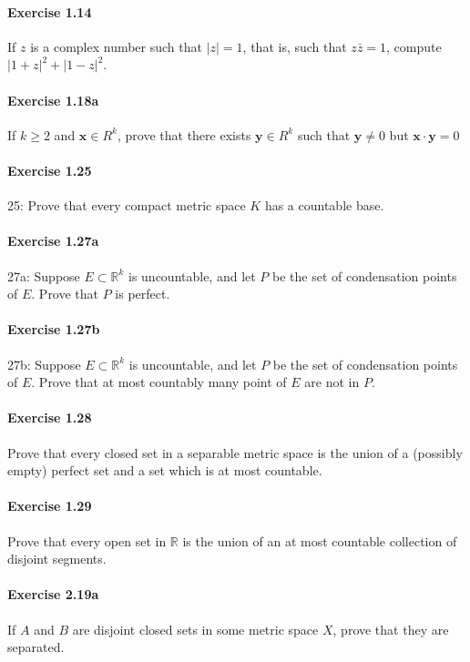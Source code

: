 \documentclass{article}
\begin{document}
\paragraph{Exercise 1.14} If $z$ is a complex number such that $|z|=1$, that is, such that $z \bar{z}=1$, compute $|1+z|^{2}+|1-z|^{2}$.

\paragraph{Exercise 1.18a} If $k \geq 2$ and $\mathbf{x} \in R^{k}$, prove that there exists $\mathbf{y} \in R^{k}$ such that $\mathbf{y} \neq 0$ but $\mathbf{x} \cdot \mathbf{y}=0$

\paragraph{Exercise 1.25} 25: Prove that every compact metric space $K$ has a countable base.

\paragraph{Exercise 1.27a} 27a: Suppose $E\subset\mathbb{R}^k$ is uncountable, and let $P$ be the set of condensation points of $E$. Prove that $P$ is perfect.

\paragraph{Exercise 1.27b} 27b: Suppose $E\subset\mathbb{R}^k$ is uncountable, and let $P$ be the set of condensation points of $E$. Prove that at most countably many point of $E$ are not in $P$.

\paragraph{Exercise 1.28} Prove that every closed set in a separable metric space is the union of a (possibly empty) perfect set and a set which is at most countable.

\paragraph{Exercise 1.29} Prove that every open set in $\mathbb{R}$ is the union of an at most countable collection of disjoint segments.

\paragraph{Exercise 2.19a} If $A$ and $B$ are disjoint closed sets in some metric space $X$, prove that they are separated.
\end{document}
